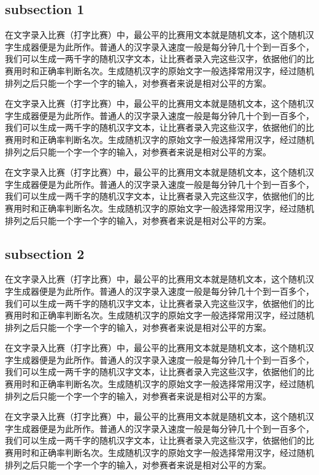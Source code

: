 \documentclass[12pt,hyperref,UTF8]{ctexbook}
\begin{document}
\subsection{subsection 1}

在文字录入比赛（打字比赛）中，最公平的比赛用文本就是随机文本，这个随机汉字生成器便是为此所作。普通人的汉字录入速度一般是每分钟几十个到一百多个，我们可以生成一两千字的随机汉字文本，让比赛者录入完这些汉字，依据他们的比赛用时和正确率判断名次。生成随机汉字的原始文字一般选择常用汉字，经过随机排列之后只能一个字一个字的输入，对参赛者来说是相对公平的方案。

在文字录入比赛（打字比赛）中，最公平的比赛用文本就是随机文本，这个随机汉字生成器便是为此所作。普通人的汉字录入速度一般是每分钟几十个到一百多个，我们可以生成一两千字的随机汉字文本，让比赛者录入完这些汉字，依据他们的比赛用时和正确率判断名次。生成随机汉字的原始文字一般选择常用汉字，经过随机排列之后只能一个字一个字的输入，对参赛者来说是相对公平的方案。

在文字录入比赛（打字比赛）中，最公平的比赛用文本就是随机文本，这个随机汉字生成器便是为此所作。普通人的汉字录入速度一般是每分钟几十个到一百多个，我们可以生成一两千字的随机汉字文本，让比赛者录入完这些汉字，依据他们的比赛用时和正确率判断名次。生成随机汉字的原始文字一般选择常用汉字，经过随机排列之后只能一个字一个字的输入，对参赛者来说是相对公平的方案。

\subsection{subsection 2}

在文字录入比赛（打字比赛）中，最公平的比赛用文本就是随机文本，这个随机汉字生成器便是为此所作。普通人的汉字录入速度一般是每分钟几十个到一百多个，我们可以生成一两千字的随机汉字文本，让比赛者录入完这些汉字，依据他们的比赛用时和正确率判断名次。生成随机汉字的原始文字一般选择常用汉字，经过随机排列之后只能一个字一个字的输入，对参赛者来说是相对公平的方案。

在文字录入比赛（打字比赛）中，最公平的比赛用文本就是随机文本，这个随机汉字生成器便是为此所作。普通人的汉字录入速度一般是每分钟几十个到一百多个，我们可以生成一两千字的随机汉字文本，让比赛者录入完这些汉字，依据他们的比赛用时和正确率判断名次。生成随机汉字的原始文字一般选择常用汉字，经过随机排列之后只能一个字一个字的输入，对参赛者来说是相对公平的方案。

在文字录入比赛（打字比赛）中，最公平的比赛用文本就是随机文本，这个随机汉字生成器便是为此所作。普通人的汉字录入速度一般是每分钟几十个到一百多个，我们可以生成一两千字的随机汉字文本，让比赛者录入完这些汉字，依据他们的比赛用时和正确率判断名次。生成随机汉字的原始文字一般选择常用汉字，经过随机排列之后只能一个字一个字的输入，对参赛者来说是相对公平的方案。
\end{document}

